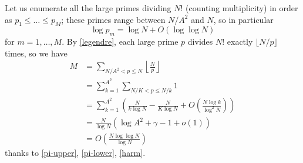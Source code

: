 \documentclass[12pt,a4paper,reqno]{amsart}
\numberwithin{equation}{section}
\theoremstyle{plain}
\theoremstyle{definition}
\begin{document}
Let us enumerate all the large primes dividing $N!$ (counting multiplicity) in order as $p_1 \leq \dots \leq p_M$; these primes range between $N/A^2$ and $N$, so in particular
\begin{equation}\label{log-p}
  \log p_m = \log N + O(\log \log N)
\end{equation}
for $m=1,\dots,M$.  By \eqref{legendre}, each large prime $p$ divides $N!$ exactly $\lfloor N/p \rfloor$ times, so we have
\begin{align}
  M &= \sum_{N/A^2 < p \leq N} \left \lfloor \frac{N}{p} \right \rfloor \nonumber \\
  &= \sum_{k=1}^{A^2} \sum_{N/K < p \leq N/k} 1 \nonumber \\
  &= \sum_{k=1}^{A^2} \left(\frac{N}{k\log N} - \frac{N}{K \log N} + O\left( \frac{N \log k}{\log^2 N} \right)\right)  \nonumber \\
  &= \frac{N}{\log N} (\log A^2 + \gamma - 1 + o(1)) \label{gamma}\\
  &= O\left( \frac{N \log\log N}{\log N} \right)\nonumber
\end{align}
thanks to \eqref{pi-upper}, \eqref{pi-lower}, \eqref{harm}.
\end{document}
